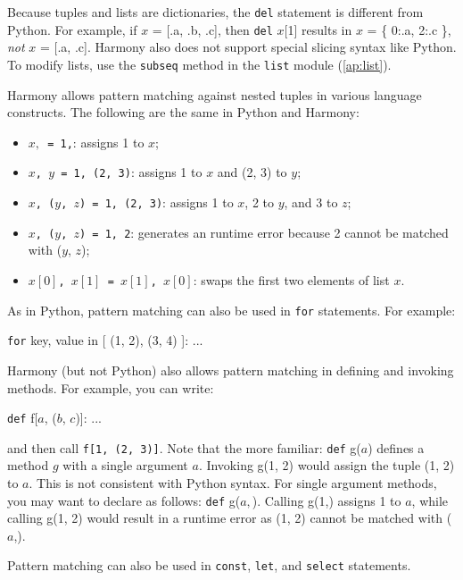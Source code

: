 \documentclass{report}
\newenvironment{code}{
\tcolorbox
}{
\endtcolorbox
}
\begin{document}
Because tuples and lists are dictionaries, the \texttt{del} statement is
different from Python.  For example, if $x$ = [.a, .b, .c], then
\texttt{del} $x$[1] results in $x$ = \{ 0:.a, 2:.c \}, \emph{not}
$x$ = [.a, .c].
Harmony also does not support special slicing syntax like Python.
To modify lists, use the \texttt{subseq} method in the \texttt{list} module
(\autoref{ap:list}).

Harmony allows pattern matching against nested tuples in various
language constructs.
%
The following are the same in Python and Harmony:
\begin{itemize}
\item \texttt{$x,$ = 1,}: assigns 1 to $x$;
\item \texttt{$x$, $y$ = 1, (2, 3)}: assigns 1 to $x$ and (2, 3) to $y$;
\item \texttt{$x$, ($y$, $z$) = 1, (2, 3)}: assigns 1 to $x$, 2 to $y$, and
3 to $z$;
\item \texttt{$x$, ($y$, $z$) = 1, 2}: generates an runtime error because 2 cannot
be matched with ($y$, $z$);
\item \texttt{$x[0]$, $x[1]$ = $x[1]$, $x[0]$}: swaps the first two elements of list $x$.
\end{itemize}

As in Python, pattern matching can also be used in \texttt{for} statements.
For example:
\begin{code}
\texttt{for} key, value in [ (1, 2), (3, 4) ]:
    ...
\end{code}

Harmony (but not Python)
also allows pattern matching in defining and invoking methods.
For example, you can write:
\begin{code}
\texttt{def} f[$a$, ($b$, $c$)]: ...
\end{code}
and then call \texttt{f[1, (2, 3)]}.
Note that the more familiar: \texttt{def} g($a$) defines a method $g$ with
a single argument $a$.  Invoking g(1, 2) would assign the tuple (1, 2) to
$a$.  This is not consistent with Python syntax.  For single argument methods,
you may want to declare as follows: \texttt{def} g($a,$).
Calling g(1,) assigns 1 to $a$, while calling g(1, 2) would result in a
runtime error as (1, 2) cannot be matched with ($a$,).

Pattern matching can also be used in \texttt{const}, \texttt{let},
and \texttt{select} statements.
\end{document}

